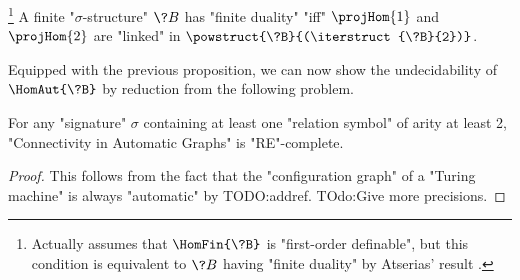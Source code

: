 
\begin{proposition}%
	\!\footnote{Actually \cite[Theorem 4.7]{LaroseLotenTardif2007CharacterisationFOCSP} assumes
	that $\HomFin{\?B}$ is "first-order definable", but this condition
	is equivalent to $\?B$ having "finite duality" by Atserias' result
	\cite[Corollary 4]{Atserias2008DigraphColoring}.}%
	\AP\label{prop:characterization-finite-duality-path-projections}
	A finite "$\sigma$-structure" $\?B$ has "finite duality" "iff"
	$\projHom{1}$ and $\projHom{2}$ are "linked" in $\powstruct{\?B}{(\iterstruct{\?B}{2})}$.
\end{proposition}

Equipped with the previous proposition, we can now show the undecidability 
of $\HomAut{\?B}$ by reduction from the following problem.

\begin{property}
	\AP\label{prop:undecidability-connectivity}
	For any "signature" $\sigma$ containing at least one "relation symbol" of
	arity at least 2, "Connectivity in Automatic Graphs" is "RE"-complete.
\end{property}

\begin{proof}
	This follows from the fact that the "configuration graph" of
	a "Turing machine" is always "automatic" by TODO:addref.
	TOdo:Give more precisions.
\end{proof}

